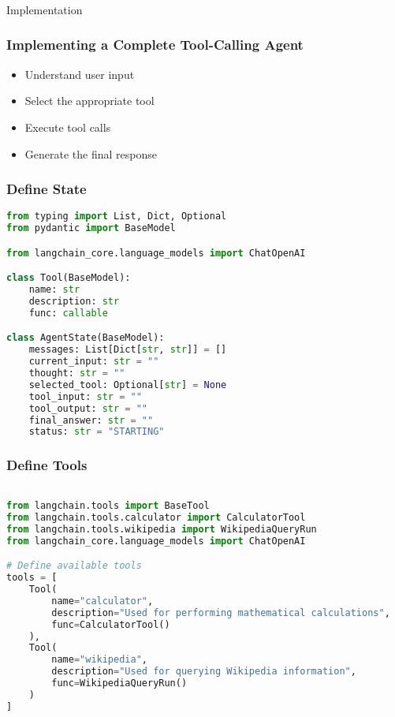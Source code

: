 \begin{frame}[fragile]\frametitle{}
\begin{center}
{\Large Implementation}
\end{center}
\end{frame}

\begin{frame}[fragile]\frametitle{Implementing a Complete Tool-Calling Agent}
      \begin{itemize}
        \item Understand user input
        \item Select the appropriate tool
        \item Execute tool calls
        \item Generate the final response
      \end{itemize}
\end{frame}


\begin{frame}[fragile]\frametitle{Define State }
      \begin{lstlisting}[language=Python, basicstyle=\tiny]
from typing import List, Dict, Optional
from pydantic import BaseModel

from langchain_core.language_models import ChatOpenAI

class Tool(BaseModel):
    name: str
    description: str
    func: callable

class AgentState(BaseModel):
    messages: List[Dict[str, str]] = []
    current_input: str = ""
    thought: str = ""
    selected_tool: Optional[str] = None
    tool_input: str = ""
    tool_output: str = ""
    final_answer: str = ""
    status: str = "STARTING"

      \end{lstlisting}

\end{frame}

\begin{frame}[fragile]\frametitle{Define Tools}
      \begin{lstlisting}[language=Python, basicstyle=\tiny]

from langchain.tools import BaseTool
from langchain.tools.calculator import CalculatorTool
from langchain.tools.wikipedia import WikipediaQueryRun
from langchain_core.language_models import ChatOpenAI

# Define available tools
tools = [
    Tool(
        name="calculator",
        description="Used for performing mathematical calculations",
        func=CalculatorTool()
    ),
    Tool(
        name="wikipedia",
        description="Used for querying Wikipedia information",
        func=WikipediaQueryRun()
    )
]	
      \end{lstlisting}

\end{frame}


